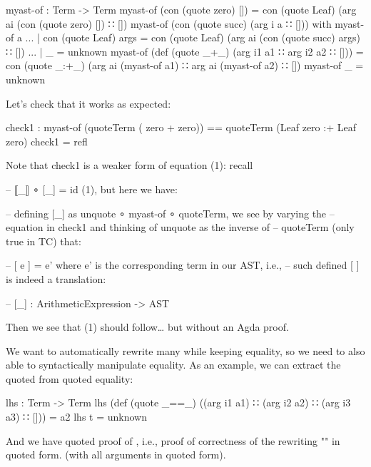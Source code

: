 \documentclass{article}
\begin{document}
\begin{code}
myast-of : Term -> Term
myast-of (con (quote zero) []) = con (quote Leaf) (arg ai (con (quote zero) []) ∷ [])
myast-of (con (quote succ) (arg i a ∷ [])) with myast-of a
... | con (quote Leaf) args = con (quote Leaf) (arg ai (con (quote succ) args) ∷ [])
... | _ = unknown
myast-of (def (quote _+_) (arg i1 a1 ∷ arg i2 a2 ∷ [])) = con (quote _:+_) (arg ai (myast-of a1) ∷ arg ai (myast-of a2) ∷ [])
myast-of _ = unknown
\end{code}

Let's check that it works as expected:

\begin{code}
check1 : myast-of (quoteTerm ( zero + zero)) == quoteTerm (Leaf zero :+ Leaf zero)
check1 = refl
\end{code}

Note that check1 is a weaker form of equation (1): recall

\begin{code}
-- ⟦_⟧ ∘ [_] = id (1), but here we have:

-- defining [_] as unquote ∘ myast-of ∘ quoteTerm, we see by varying the
-- equation in check1 and thinking of unquote as the inverse of
-- quoteTerm (only true in TC) that:

-- [ e ] = e' where e' is the corresponding term in our AST, i.e.,
-- such defined [ ] is indeed a translation:

-- [_] : ArithmeticExpression -> AST
\end{code}

Then we see that (1) should follow\ldots{} but without an Agda proof.

We want to automatically rewrite many  \AgdaOperator{\AgdaFunction{+}}  while keeping equality, so we need to also able to syntactically manipulate equality. As an example, we can extract the quoted  from quoted equality:

\begin{code}
lhs : Term -> Term
lhs (def (quote _==_) ((arg i1 a1) ∷ (arg i2 a2) ∷ (arg i3 a3) ∷ [])) = a2 
lhs t = unknown
\end{code}

And we have quoted proof of    \AgdaOperator{\AgdaDatatype{==}}     , i.e., proof of correctness of the rewriting "" in quoted form. (with all arguments in quoted form).  %
\end{document}

